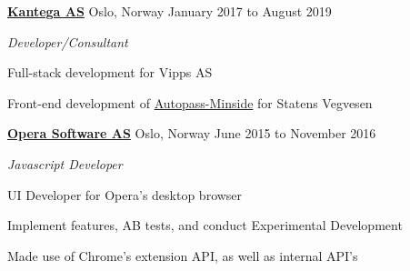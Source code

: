 \documentclass[11pt]{article}
\newenvironment{outerlist}[1][\enskip\textbullet]%
        {\begin{itemize}[#1]}{\end{itemize}%
         \vspace{-.6\baselineskip}}
\newenvironment{innerlist}[1][\enskip\textbullet]%
        {\begin{compactitem}[#1]}{\end{compactitem}}
\newcommand{\blankline}{\quad\pagebreak[2]}
\begin{document}
\href{http://www.kantega.no/}{\textbf{Kantega AS}}
Oslo, Norway
\hfill January 2017 to August 2019
\begin{outerlist}
\item[] \textit{Developer/Consultant}
  \begin{innerlist}
      \footnotesize
    \item Full-stack development for Vipps AS
    \item Front-end development of \href{https://minside.autopass.no/}{Autopass-Minside} for Statens Vegvesen
    \end{innerlist}
\end{outerlist}
\blankline

\href{https://www.opera.com/}{\textbf{Opera Software AS}}
Oslo, Norway
\hfill June 2015 to November 2016
\begin{outerlist}
\item[] \textit{Javascript Developer}
  \begin{innerlist}
      \footnotesize
    \item UI Developer for Opera's desktop browser
      \begin{innerlist}
        \item Implement features, AB tests, and conduct Experimental Development
        \item Made use of Chrome's extension API, as well as internal API's
      \end{innerlist}
  \end{innerlist}
\end{outerlist}
\blankline
\end{document}
